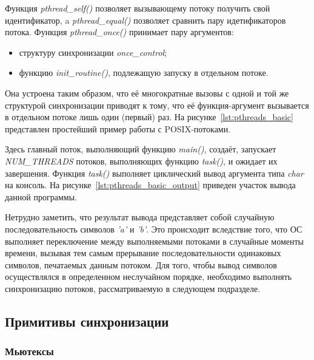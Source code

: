 Функция \textit{pthread\_self()} позволяет вызывающему потоку получить свой идентификатор,
a \textit{pthread\_equal()} позволяет сравнить пару идетификаторов потока.
Функция \textit{pthread\_once()} принимает пару аргументов:
\begin{itemize}
  \item структуру синхронизации \textit{once\_control};
  \item функцию \textit{init\_routine()}, подлежащую запуску в отдельном потоке.
\end{itemize}

Она устроена таким образом, что её многократные вызовы с одной и той же структурой синхронизации
приводят к тому, что её функция-аргумент вызывается в отдельном потоке лишь один (первый) раз.
На рисунке~\ref{lst:pthreads_basic} представлен простейший пример работы с POSIX-потоками.
\pagebreak



Здесь главный поток, выполняющий функцию \textit{main()},
создаёт, запускает \textit{NUM\_THREADS} потоков, выполняющих функцию \textit{task()},
и ожидает их завершения. Функция \textit{task()} выполняет циклический вывод
аргумента типа \textit{char} на консоль. На рисунке~\ref{lst:pthreads_basic_output}
приведен участок вывода данной программы.
\pagebreak



Нетрудно заметить, что результат вывода представляет собой случайную
последовательность символов \textit{'a'} и \textit{'b'}.
Это происходит вследствие того, что ОС выполняет переключение между
выполняемыми потоками в случайные моменты времени, вызывая тем самым прерывание
последовательности одинаковых символов, печатаемых данным потоком.
Для того, чтобы вывод символов осуществлялся в определенном неслучайном порядке,
необходимо выполнять синхронизацию потоков, рассматриваемую в следующем подразделе.

\subsection{Примитивы синхронизации}

\subsubsection{Мьютексы}

